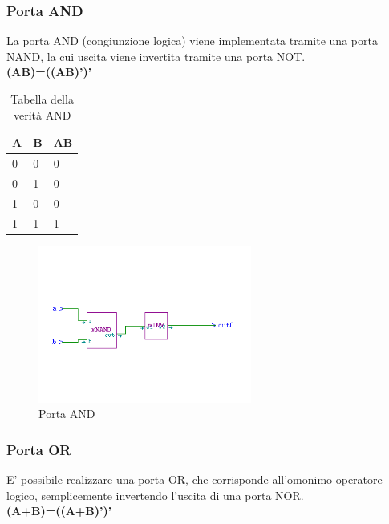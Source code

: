 \documentclass[10pt]{article}
\begin{document}
\begin{itemize}
\subsubsection{Porta AND}
La porta AND (congiunzione logica) viene implementata tramite una porta NAND, la cui uscita viene invertita tramite una porta NOT.
\\
\textbf{(AB)=((AB)')'}
\\
\begin{table}[H]
    \begin{minipage}[b]{\textwidth}
    \centering
    \begin{tabular}{|ll|l|}
        \hline
        \textbf{A} & \textbf{B} & \textbf{AB} \\ \hline
        0          & 0          & 0           \\ \hline
        0          & 1          & 0           \\ 
        1          & 0          & 0           \\ 
        1          & 1          & 1           \\ \hline
        \end{tabular}
        \caption{Tabella della verità AND}
        \label{table:student}
    \end{minipage}
    \end{table}
    
    \begin{figure}[H]
    \begin{minipage}[b]{\textwidth}
    
    \includegraphics[width=70mm]{and}
    \caption{Porta AND}
    \label{ }
    \end{minipage}
    \end{figure}

\subsubsection{Porta OR}
E' possibile realizzare una porta OR, che corrisponde all'omonimo operatore logico, semplicemente invertendo l'uscita di una porta NOR.
\\
\textbf{(A+B)=((A+B)')'}
\\


\end{itemize}
\end{document}

